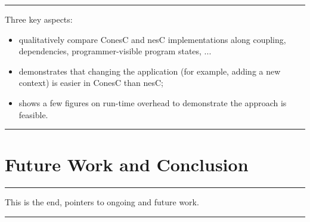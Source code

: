 \documentclass[10pt, conference, compsocconf]{IEEEtran}
\begin{document}
\hrule
\noindent Three key aspects:
\begin{itemize}
\item qualitatively compare ConesC and nesC implementations along
  coupling, dependencies, programmer-visible program states, ...
\item demonstrates that changing the application (for example, adding
  a new context) is easier in ConesC than nesC;
\item shows a few figures on run-time overhead to demonstrate the
  approach is feasible.
\end{itemize}
\hrule




\section{Future Work and Conclusion}
\label{sec:ending}

\hrule
This is the end, pointers to ongoing and future work.
\hrule


\IEEEpeerreviewmaketitle



\end{document}
